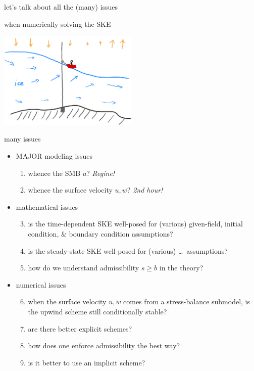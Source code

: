 \documentclass[10pt,dvipsnames]{beamer}
\newcommand{\comm}[1]{{\footnotesize \hfill \emph{#1}}}
\begin{document}
\begin{frame}[standout]
let's talk about all the (many) issues

when numerically solving the SKE

\vspace{10mm}
\begin{center}
\includegraphics[width=0.5\textwidth]{boatplus}
\end{center}
\end{frame}


\begin{frame}{many issues}
\begin{itemize}
\item[] \alert{MAJOR modeling issues}
    \begin{enumerate}
    \item whence the SMB $a$? \comm{Regine!}
    \item whence the surface velocity $u,w$? \comm{2nd hour!}
    \end{enumerate}
\item[] \alert{mathematical issues}
    \begin{enumerate}\setcounter{enumi}{2}
    \item is the time-dependent SKE well-posed for (various) given-field, initial condition, \& boundary condition assumptions?
    \item is the steady-state SKE well-posed for (various) \dots \, assumptions?
    \item how do we understand admissibility $s\ge b$ in the theory?
    \end{enumerate}
\item[] \alert{numerical issues}
    \begin{enumerate}\setcounter{enumi}{5}
    \item when the surface velocity $u, w$ comes from a stress-balance submodel, is the upwind scheme still conditionally stable?
    \item are there better explicit schemes?
    \item how does one enforce admissibility the best way?
    \item is it better to use an implicit scheme?
    \end{enumerate}
\end{itemize}
\end{frame}
\end{document}
